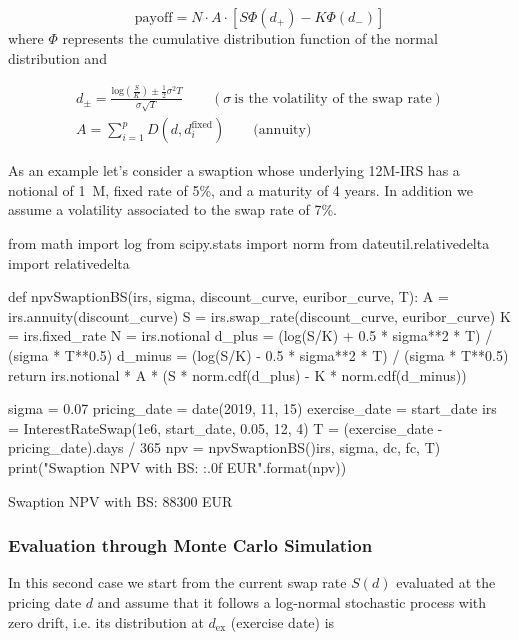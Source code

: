 \begin{equation}
\mathrm{payoff} = N\cdot A\cdot [S \Phi(d_+) - K\Phi(d_-)]
\end{equation}
where $\Phi$ represents the cumulative distribution function of the normal distribution and

\begin{equation}
\begin{gathered}d_{\pm} = \frac{\mathrm{log}(\frac{S}{K}) \pm \frac{1}{2}\sigma^{2}T}{\sigma\sqrt{T}}\qquad(\sigma~\textrm{is the volatility of the swap rate})\\
A =\sum_{i=1}^{p}D(d, d_{i}^{\mathrm{fixed}})\qquad\mathrm{(annuity})
\end{gathered}
\end{equation}

As an example let's consider a swaption whose underlying 12M-IRS has a notional of 1~M, fixed rate of 5\%, and a maturity of 4 years. In addition we assume a volatility associated to the swap rate of 7\%.

\begin{ipython}
from math import log
from scipy.stats import norm
from dateutil.relativedelta import relativedelta

def npvSwaptionBS(irs, sigma, discount_curve, euribor_curve, T):
    A = irs.annuity(discount_curve)
    S = irs.swap_rate(discount_curve, euribor_curve)
    K = irs.fixed_rate
    N = irs.notional
    d_plus = (log(S/K) + 0.5 * sigma**2 * T) / (sigma * T**0.5)
    d_minus = (log(S/K) - 0.5 * sigma**2 * T) / (sigma * T**0.5)
    return irs.notional * A * (S * norm.cdf(d_plus) - K * norm.cdf(d_minus))

sigma = 0.07
pricing_date = date(2019, 11, 15)
exercise_date = start_date
irs = InterestRateSwap(1e6, start_date, 0.05, 12, 4)
T = (exercise_date - pricing_date).days / 365
npv = npvSwaptionBS()irs, sigma, dc, fc, T)
print("Swaption NPV with BS: {:.0f} EUR".format(npv))
\end{ipython}
\begin{ioutput}
Swaption NPV with BS: 88300 EUR
\end{ioutput}

\subsubsection{Evaluation through Monte Carlo Simulation}
\label{evaluation-through-monte-carlo-simulation}

In this second case we start from the current swap rate \(S(d)\) evaluated at the pricing date \(d\) and assume that it follows a log-normal stochastic process with zero drift, i.e. its distribution at \(d_{\mathrm{ex}}\) (exercise date) is 

